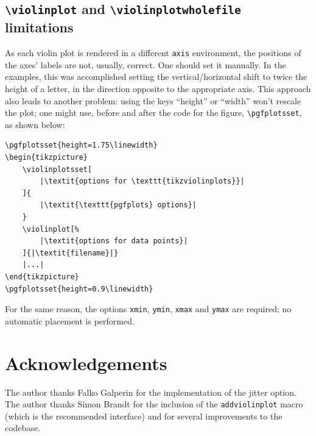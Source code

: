 \documentclass{article}
\begin{document}
\subsection{\texttt{{\textbackslash}violinplot} and
\texttt{{\textbackslash}violinplotwholefile} limitations}

As each violin plot is rendered in a different \texttt{axis} environment,
the positions of the axes' labels are not, usually, correct. One should
set it manually. In the examples, this was accomplished setting the
vertical/horizontal shift to twice the height of a letter, in the direction
opposite to the appropriate axis. This approach also leads to another problem:
using the keys ``height'' or ``width'' won't rescale the plot; one might use,
before and after the code for the figure, \texttt{\textbackslash pgfplotsset},
as shown below:


\begin{verbatim}
\pgfplotsset{height=1.75\linewidth}
\begin{tikzpicture}
	\violinplotsset[
		|\textit{options for \texttt{tikzviolinplots}}|
	]{
		|\textit{\texttt{pgfplots} options}|
	}
	\violinplot[%
		|\textit{options for data points}|
	]{|\textit{filename}|}
	|...|
\end{tikzpicture}
\pgfplotsset{height=0.9\linewidth}
\end{verbatim}

For the same reason, the options \texttt{xmin}, \texttt{ymin}, \texttt{xmax}
and \texttt{ymax} are required; no automatic placement is performed.

\section{Acknowledgements}

The author thanks Falko Galperin for the implementation of the jitter option.
The author thanks Simon Brandt for the inclusion of the \texttt{addviolinplot}
macro (which is the recommended interface) and for several improvements to the
codebase.
\end{document}
